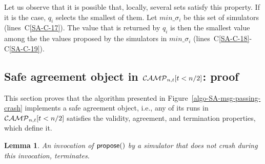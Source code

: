\documentclass[11pt,letterpaper]{article}
\newtheorem{lemma}{Lemma}
\newcommand{\CM}{{\cal CAMP}_{n,t}}
\begin{document}
Let us observe that it is possible that, locally,  several sets satisfy this
property. If it is the case, $q_i$ selects the smallest of them.
Let $min\_\sigma_i$ be this set of simulators (lines~C\ref{SA-C-17}).
The  value that is returned by $q_i$ is then the smallest
value among the the values proposed by the simulators in  $min\_\sigma_i$
(lines~C\ref{SA-C-18}-C\ref{SA-C-19}).


\subsection{Safe agreement object in $\CM[t<n/2]$: proof}
This section proves that the algorithm presented in
Figure~\ref{algo-SA-msg-passing-crash} implements a safe agreement object,
i.e., any of its runs in  $\CM[t<n/2]$  satisfies the validity, agreement,
and termination properties, which define it.


\begin{lemma}
\label{lemma:safe-agr-term-propose}
An invocation of  ${\sf propose}()$ by a simulator that does not crash
during this  invocation,  terminates.
\end{lemma}
\end{document}
